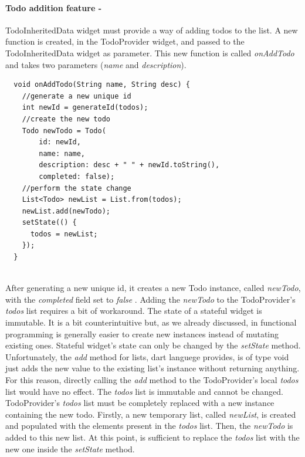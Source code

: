 \paragraph{Todo addition feature - } 
\label{subpar: todo_addition_feature_inherited_widget}
TodoInheritedData widget must provide a way of adding todos to the list. A new function is created, in the TodoProvider widget, and passed to the TodoInheritedData widget as parameter. This new function is called \textit{onAddTodo} and takes two parameters (\textit{name} and \textit{description}).
\mbox{}\\
\mbox{}
\begin{code}
\label{code:2.32}
\begin{verbatim}
  void onAddTodo(String name, String desc) {
    //generate a new unique id
    int newId = generateId(todos);
    //create the new todo
    Todo newTodo = Todo(
        id: newId,
        name: name,
        description: desc + " " + newId.toString(),
        completed: false);
    //perform the state change
    List<Todo> newList = List.from(todos);
    newList.add(newTodo);
    setState(() {
      todos = newList;
    });
  }
\end{verbatim}
\end{code}
\mbox{}\\
After generating a new unique id, it creates a new Todo instance, called \textit{newTodo}, with the \textit{completed }field set to \textit{false }. Adding the \textit{newTodo} to the TodoProvider’s \textit{todos }list requires a bit of workaround. The state of a stateful widget is immutable. It is a bit counterintuitive but, as we already discussed, in functional programming is generally easier to create new instances instead of mutating existing ones. Stateful widget's state can only be changed by the \textit{setState } method. Unfortunately, the \textit{add} method for lists, dart languege provides, is of type void just adds the new value to the existing list's instance without returning anything. For this reason, directly calling the \textit{add} method to the TodoProvider’s local \textit{todos }list would have no effect. The \textit{todos} list is immutable and cannot be changed.
TodoProvider’s \textit{todos }list must be completely replaced with a new instance containing the new todo. Firstly, a new temporary list, called \textit{newList}, is created and populated with the elements present in the \textit{todos }list. Then, the \textit{newTodo }is added to this new list. At this point, is sufficient to replace the \textit{todos }list with the new one inside the \textit{setState} method.\\
